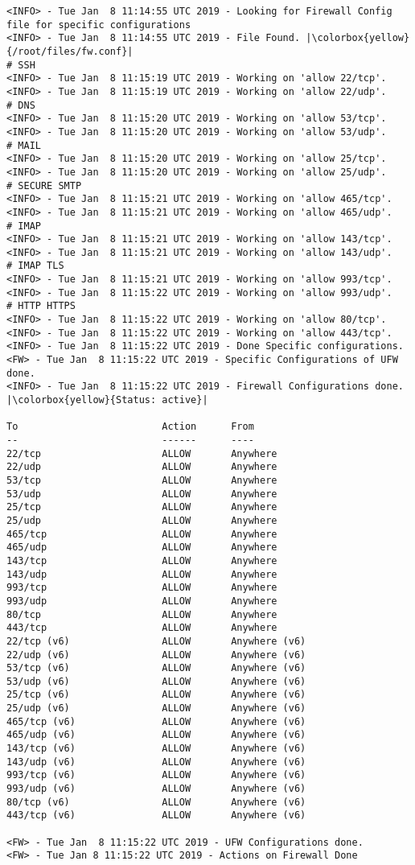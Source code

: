 \begin{lstlisting}[escapeinside=||]
<INFO> - Tue Jan  8 11:14:55 UTC 2019 - Looking for Firewall Config file for specific configurations
<INFO> - Tue Jan  8 11:14:55 UTC 2019 - File Found. |\colorbox{yellow}{/root/files/fw.conf}|
# SSH
<INFO> - Tue Jan  8 11:15:19 UTC 2019 - Working on 'allow 22/tcp'.
<INFO> - Tue Jan  8 11:15:19 UTC 2019 - Working on 'allow 22/udp'.
# DNS
<INFO> - Tue Jan  8 11:15:20 UTC 2019 - Working on 'allow 53/tcp'.
<INFO> - Tue Jan  8 11:15:20 UTC 2019 - Working on 'allow 53/udp'.
# MAIL
<INFO> - Tue Jan  8 11:15:20 UTC 2019 - Working on 'allow 25/tcp'.
<INFO> - Tue Jan  8 11:15:20 UTC 2019 - Working on 'allow 25/udp'.
# SECURE SMTP
<INFO> - Tue Jan  8 11:15:21 UTC 2019 - Working on 'allow 465/tcp'.
<INFO> - Tue Jan  8 11:15:21 UTC 2019 - Working on 'allow 465/udp'.
# IMAP
<INFO> - Tue Jan  8 11:15:21 UTC 2019 - Working on 'allow 143/tcp'.
<INFO> - Tue Jan  8 11:15:21 UTC 2019 - Working on 'allow 143/udp'.
# IMAP TLS
<INFO> - Tue Jan  8 11:15:21 UTC 2019 - Working on 'allow 993/tcp'.
<INFO> - Tue Jan  8 11:15:22 UTC 2019 - Working on 'allow 993/udp'.
# HTTP HTTPS
<INFO> - Tue Jan  8 11:15:22 UTC 2019 - Working on 'allow 80/tcp'.
<INFO> - Tue Jan  8 11:15:22 UTC 2019 - Working on 'allow 443/tcp'.
<INFO> - Tue Jan  8 11:15:22 UTC 2019 - Done Specific configurations.
<FW> - Tue Jan  8 11:15:22 UTC 2019 - Specific Configurations of UFW done.
<INFO> - Tue Jan  8 11:15:22 UTC 2019 - Firewall Configurations done.
|\colorbox{yellow}{Status: active}|

To                         Action      From
--                         ------      ----
22/tcp                     ALLOW       Anywhere
22/udp                     ALLOW       Anywhere
53/tcp                     ALLOW       Anywhere
53/udp                     ALLOW       Anywhere
25/tcp                     ALLOW       Anywhere
25/udp                     ALLOW       Anywhere
465/tcp                    ALLOW       Anywhere
465/udp                    ALLOW       Anywhere
143/tcp                    ALLOW       Anywhere
143/udp                    ALLOW       Anywhere
993/tcp                    ALLOW       Anywhere
993/udp                    ALLOW       Anywhere
80/tcp                     ALLOW       Anywhere
443/tcp                    ALLOW       Anywhere
22/tcp (v6)                ALLOW       Anywhere (v6)
22/udp (v6)                ALLOW       Anywhere (v6)
53/tcp (v6)                ALLOW       Anywhere (v6)
53/udp (v6)                ALLOW       Anywhere (v6)
25/tcp (v6)                ALLOW       Anywhere (v6)
25/udp (v6)                ALLOW       Anywhere (v6)
465/tcp (v6)               ALLOW       Anywhere (v6)
465/udp (v6)               ALLOW       Anywhere (v6)
143/tcp (v6)               ALLOW       Anywhere (v6)
143/udp (v6)               ALLOW       Anywhere (v6)
993/tcp (v6)               ALLOW       Anywhere (v6)
993/udp (v6)               ALLOW       Anywhere (v6)
80/tcp (v6)                ALLOW       Anywhere (v6)
443/tcp (v6)               ALLOW       Anywhere (v6)

<FW> - Tue Jan  8 11:15:22 UTC 2019 - UFW Configurations done.
<FW> - Tue Jan 8 11:15:22 UTC 2019 - Actions on Firewall Done
\end{lstlisting}
\newpage


